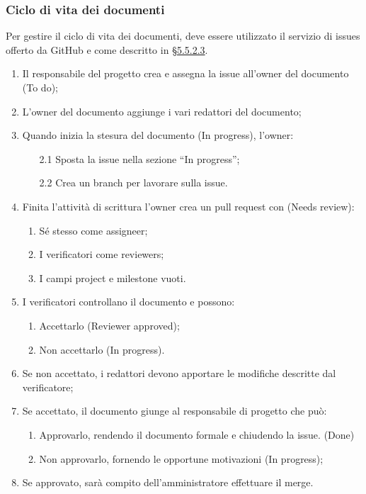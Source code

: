 \subsubsection{Ciclo di vita dei documenti}
Per gestire il ciclo di vita dei documenti, deve essere utilizzato il servizio di issues offerto da GitHub e come descritto in \hyperref[sec:projectboard]{§5.5.2.3}.
\begin{enumerate}
\item Il responsabile del progetto crea e assegna la issue all'owner del documento (To do);
\item L'owner del documento aggiunge i vari redattori del documento;
\item Quando inizia la stesura del documento (In progress), l'owner:
	\begin{enumerate}
		\item[2.1] Sposta la issue nella sezione “In progress”;
		\item[2.2] Crea un branch per lavorare sulla issue.
	\end{enumerate}
\item Finita l'attività di scrittura l'owner crea un {pull request} con (Needs review):
	\begin{enumerate}
		\item Sé stesso come assigneer;
		\item I verificatori come reviewers;
		\item I campi project e milestone vuoti.
	\end{enumerate} 
\item I verificatori controllano il documento e possono:
	\begin{enumerate}
	 	\item Accettarlo (Reviewer approved);
	 	\item Non accettarlo (In progress).
	\end{enumerate}
\item Se non accettato, i redattori devono apportare le modifiche descritte dal verificatore;
\item Se accettato, il documento giunge al responsabile di progetto che può:
\begin{enumerate}
	\item Approvarlo, rendendo il documento formale e chiudendo la issue. (Done)
	\item Non approvarlo, fornendo le opportune motivazioni (In progress);
\end{enumerate}
\item Se approvato, sarà compito dell'amministratore effettuare il merge.
\end{enumerate}
